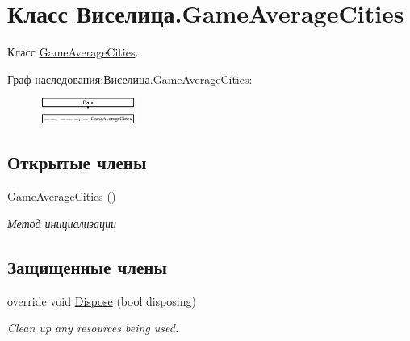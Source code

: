 \hypertarget{class_xD0_x92_xD0_xB8_xD1_x81_xD0_xB5_xD0_xBB_xD0_xB8_xD1_x86_xD0_xB0_1_1_game_average_cities}{\section{Класс Виселица.\+Game\+Average\+Cities}
\label{class_xD0_x92_xD0_xB8_xD1_x81_xD0_xB5_xD0_xBB_xD0_xB8_xD1_x86_xD0_xB0_1_1_game_average_cities}
}


Класс \hyperlink{class_xD0_x92_xD0_xB8_xD1_x81_xD0_xB5_xD0_xBB_xD0_xB8_xD1_x86_xD0_xB0_1_1_game_average_cities}{Game\+Average\+Cities}.  


Граф наследования\+:Виселица.\+Game\+Average\+Cities\+:\begin{figure}[H]
\begin{center}
\leavevmode
\includegraphics[height=0.825350cm]{class_xD0_x92_xD0_xB8_xD1_x81_xD0_xB5_xD0_xBB_xD0_xB8_xD1_x86_xD0_xB0_1_1_game_average_cities}
\end{center}
\end{figure}
\subsection*{Открытые члены}
\begin{DoxyCompactItemize}
\item 
\hyperlink{class_xD0_x92_xD0_xB8_xD1_x81_xD0_xB5_xD0_xBB_xD0_xB8_xD1_x86_xD0_xB0_1_1_game_average_cities_a9d5c6af66340f064859d5b3c6348658b}{Game\+Average\+Cities} ()
\begin{DoxyCompactList}\small\item\em Метод инициализации \end{DoxyCompactList}\end{DoxyCompactItemize}
\subsection*{Защищенные члены}
\begin{DoxyCompactItemize}
\item 
override void \hyperlink{class_xD0_x92_xD0_xB8_xD1_x81_xD0_xB5_xD0_xBB_xD0_xB8_xD1_x86_xD0_xB0_1_1_game_average_cities_a2964196efec7bffeac3fa474af0799a5}{Dispose} (bool disposing)
\begin{DoxyCompactList}\small\item\em Clean up any resources being used. \end{DoxyCompactList}\end{DoxyCompactItemize}


